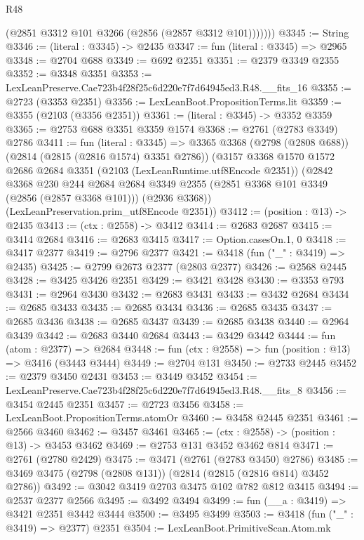 \begin{lexlean}{R48}
\begin{coremodule}
            (@2851 @3312 @101 @3266 (@2856 (@2857 @3312 @101)))))))
@3345 := String
@3346 := (literal : @3345) -> @2435
@3347 := fun (literal : @3345) => @2965
@3348 := @2704 @688
@3349 := @692 @2351
@3351 := @2379 @3349 @2355
@3352 := @3348 @3351
@3353 := LexLeanPreserve.Cae723b4f28f25c6d220e7f7d64945ed3.R48.__fits_16
@3355 := @2723 (@3353 @2351)
@3356 := LexLeanBoot.PropositionTerms.lit
@3359 := @3355 (@2103 (@3356 @2351))
@3361 := (literal : @3345) -> @3352 @3359
@3365 := @2753 @688 @3351 @3359 @1574
@3368 := @2761 (@2783 @3349) @2786
@3411 := fun (literal : @3345) =>
  @3365
    @3368
    (@2798 (@2808 @688))
    (@2814 (@2815 (@2816 @1574) @3351 @2786))
    (@3157
      @3368
      @1570
      @1572
      @2686
      @2684
      @3351
      (@2103 (LexLeanRuntime.utf8Encode @2351))
      (@2842
        @3368
        @230
        @244
        @2684
        @2684
        @3349
        @2355
        (@2851 @3368 @101 @3349 (@2856 (@2857 @3368 @101)))
        (@2936 @3368))
      (LexLeanPreservation.prim_utf8Encode @2351))
@3412 := (position : @13) -> @2435
@3413 := (ctx : @2558) -> @3412
@3414 := @2683 @2687
@3415 := @3414 @2684
@3416 := @2683 @3415
@3417 := Option.casesOn.{1, 0}
@3418 := @3417 @2377
@3419 := @2796 @2377
@3421 := @3418 (fun ("_" : @3419) => @2435)
@3425 := @2799 @2673 @2377 (@2803 @2377)
@3426 := @2568 @2445
@3428 := @3425 @3426 @2351
@3429 := @3421 @3428
@3430 := @3353 @793
@3431 := @2964 @3430
@3432 := @2683 @3431
@3433 := @3432 @2684
@3434 := @2685 @3433
@3435 := @2685 @3434
@3436 := @2685 @3435
@3437 := @2685 @3436
@3438 := @2685 @3437
@3439 := @2685 @3438
@3440 := @2964 @3439
@3442 := @2683 @3440 @2684
@3443 := @3429 @3442
@3444 := fun (atom : @2377) => @2684
@3448 := fun (ctx : @2558) => fun (position : @13) => @3416 (@3443 @3444)
@3449 := @2704 @131
@3450 := @2733 @2445
@3452 := @2379 @3450 @2431
@3453 := @3449 @3452
@3454 := LexLeanPreserve.Cae723b4f28f25c6d220e7f7d64945ed3.R48.__fits_8
@3456 := @3454 @2445 @2351
@3457 := @2723 @3456
@3458 := LexLeanBoot.PropositionTerms.atomOr
@3460 := @3458 @2445 @2351
@3461 := @2566 @3460
@3462 := @3457 @3461
@3465 := (ctx : @2558) -> (position : @13) -> @3453 @3462
@3469 := @2753 @131 @3452 @3462 @814
@3471 := @2761 (@2780 @2429)
@3475 := @3471 (@2761 (@2783 @3450) @2786)
@3485 := @3469 @3475 (@2798 (@2808 @131)) (@2814 (@2815 (@2816 @814) @3452 @2786))
@3492 := @3042 @3419 @2703 @3475 @102 @782 @812 @3415
@3494 := @2537 @2377 @2566
@3495 := @3492 @3494
@3499 := fun (__a : @3419) => @3421 @2351 @3442 @3444
@3500 := @3495 @3499
@3503 := @3418 (fun ("_" : @3419) => @2377) @2351
@3504 := LexLeanBoot.PrimitiveScan.Atom.mk

\end{coremodule}
\end{lexlean}
